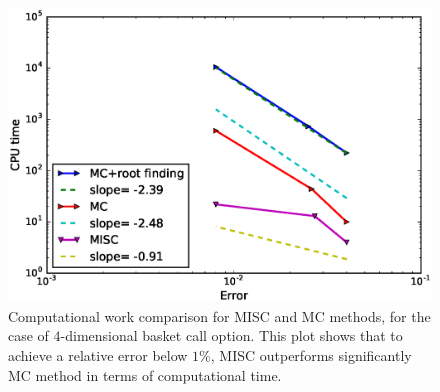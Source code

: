 \FloatBarrier


	\begin{figure}[h!]
\centering
\includegraphics[width=0.4\linewidth]{./figures/basket_call_4d_time_stepping/complexity_rates/error_vs_time}

\caption{Computational work comparison for MISC and MC methods, for the case of $4$-dimensional basket call option. This plot shows that to achieve a relative error below $1\%$, MISC outperforms significantly MC method in terms of computational time.}
\label{fig:Complexity plot for MC and MISC , 4 dim basket call non rich}
\end{figure}


\FloatBarrier

%
%
%




